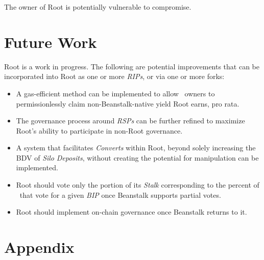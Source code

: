 \documentclass[tikz]{article}
\newcommand{\term}[1]{\textsl{#1}}
\newcommand{\Root}{} %
\begin{document}
The owner of Root is potentially vulnerable to compromise. 

\section{Future Work}
Root is a work in progress. The following are potential improvements that can be incorporated into Root as one or more \term{RIPs}, or via one or more forks:

\begin{itemize}
    \item A gas-efficient method can be implemented to allow \Root\ owners to permissionlessly claim non-Beanstalk-native yield Root earns, pro rata. 
    \item The governance process around \term{RSPs} can be further refined to maximize Root's ability to participate in non-Root governance.
    \item A system that facilitates \term{Converts} within Root, beyond solely increasing the BDV of \term{Silo} \term{Deposits}, without creating the potential for manipulation can be implemented.
    \item Root should vote only the portion of its \term{Stalk} corresponding to the percent of \Root\ that vote for a given \term{BIP} once Beanstalk supports partial votes. 
    \item Root should implement on-chain governance once Beanstalk returns to it. 
\end{itemize}

\newpage
\section{Appendix}

\newpage

\newpage
\end{document}
